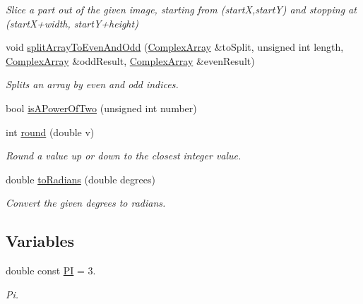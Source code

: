 \begin{DoxyCompactItemize}
\begin{DoxyCompactList}\small\item\em \-Slice a part out of the given image, starting from (start\-X,start\-Y) and stopping at (start\-X+width, start\-Y+height) \end{DoxyCompactList}\item 
void \hyperlink{namespacesimrec_1_1utils_a01c649be4224d2e423a9fd0d5711663e}{split\-Array\-To\-Even\-And\-Odd} (\hyperlink{classsimrec_1_1ComplexArray}{\-Complex\-Array} \&to\-Split, unsigned int length, \hyperlink{classsimrec_1_1ComplexArray}{\-Complex\-Array} \&odd\-Result, \hyperlink{classsimrec_1_1ComplexArray}{\-Complex\-Array} \&even\-Result)
\begin{DoxyCompactList}\small\item\em \-Splits an array by even and odd indices. \end{DoxyCompactList}\item 
bool \hyperlink{namespacesimrec_1_1utils_ac1962df3e57d1b70ba8b2e8f845690c2}{is\-A\-Power\-Of\-Two} (unsigned int number)
\item 
\hypertarget{namespacesimrec_1_1utils_a3337b0ea03d6f5b70095c95bf34d6ceb}{int \hyperlink{namespacesimrec_1_1utils_a3337b0ea03d6f5b70095c95bf34d6ceb}{round} (double v)}\label{namespacesimrec_1_1utils_a3337b0ea03d6f5b70095c95bf34d6ceb}

\begin{DoxyCompactList}\small\item\em \-Round a value up or down to the closest integer value. \end{DoxyCompactList}\item 
\hypertarget{namespacesimrec_1_1utils_ad44c6b62c49cefa9caad9e2bbe42e268}{double \hyperlink{namespacesimrec_1_1utils_ad44c6b62c49cefa9caad9e2bbe42e268}{to\-Radians} (double degrees)}\label{namespacesimrec_1_1utils_ad44c6b62c49cefa9caad9e2bbe42e268}

\begin{DoxyCompactList}\small\item\em \-Convert the given degrees to radians. \end{DoxyCompactList}\end{DoxyCompactItemize}
\subsection*{\-Variables}
\begin{DoxyCompactItemize}
\item 
\hypertarget{namespacesimrec_1_1utils_a743f1eb05e868599e5598feec655cf01}{double const \hyperlink{namespacesimrec_1_1utils_a743f1eb05e868599e5598feec655cf01}{\-P\-I} = 3.}\label{namespacesimrec_1_1utils_a743f1eb05e868599e5598feec655cf01}

\begin{DoxyCompactList}\small\item\em \-Pi. \end{DoxyCompactList}\end{DoxyCompactItemize}



